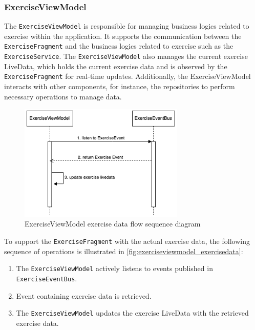 \subsubsection{ExerciseViewModel}
\label{chap:exerciseviewmodel_design}
The \texttt{ExerciseViewModel} is responsible for managing business logics related to exercise within the application.
It supports the communication between the \texttt{ExerciseFragment} and the business logics related to exercise such as the \texttt{ExerciseService}.
The \texttt{ExerciseViewModel} also manages the current exercise LiveData, which holds the current exercise data and is observed by the \texttt{ExerciseFragment} for real-time updates. 
Additionally, the ExerciseViewModel interacts with other components, for instance, the repositories to perform necessary operations to manage data.

\begin{figure}[H]
    \centering
    \includegraphics[width=0.7\textwidth]{diagrams/exercise-view-model-seq.drawio.png}
    \caption{ExerciseViewModel exercise data flow sequence diagram}
    \label{fig:exerciseviewmodel_exercisedata}
\end{figure}
To support the \texttt{ExerciseFragment} with the actual exercise data, the following sequence of operations is illustrated in \autoref{fig:exerciseviewmodel_exercisedata}:
\begin{enumerate}
    \item The \texttt{ExerciseViewModel} actively listens to events published in \texttt{ExerciseEventBus}.
    \item Event containing exercise data is retrieved.
    \item The \texttt{ExerciseViewModel} updates the exercise LiveData with the retrieved exercise data.
\end{enumerate}

